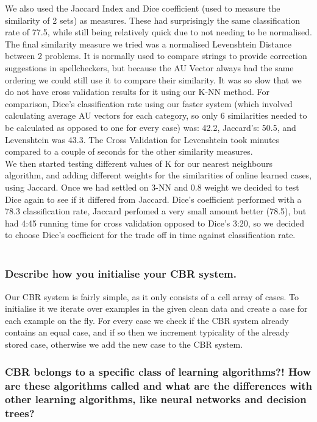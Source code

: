 \documentclass[12pt]{article}
\begin{document}
We also used the Jaccard Index and Dice coefficient (used to measure the similarity of 2 sets) as measures. These had surprisingly the same classification rate of 77.5, while still being relatively quick due to not needing to be normalised. \\

The final similarity measure we tried was a normalised Levenshtein Distance between 2 problems. It is normally used to compare strings to provide correction suggestions in spellcheckers, but because the AU Vector always had the same ordering we could still use it to compare their similarity. It was so slow that we do not have cross validation results for it using our K-NN method. For comparison, Dice's classification rate using our faster system (which involved calculating average AU vectors for each category, so only 6 similarities needed to be calculated as opposed to one for every case) was: 42.2, Jaccard's: 50.5, and Levenshtein was 43.3. The Cross Validation for Levenshtein took minutes compared to a couple of seconds for the other similarity measures.  \\

We then started testing different values of K for our nearest neighbours algorithm, and adding different weights for the similarities of online learned cases, using Jaccard. Once we had settled on 3-NN and 0.8 weight we decided to test Dice again to see if it differed from Jaccard. Dice's coefficient performed with a 78.3 classification rate, Jaccard perfomed a very small amount better (78.5), but had 4:45 running time for cross validation opposed to Dice's 3:20, so we decided to choose Dice's coefficient for the trade off in time against classification rate. \\ \\

\subsubsection*{Describe how you initialise your CBR system.}

Our CBR system is fairly simple, as it only consists of a cell array of cases. To initialise it we iterate over examples in the given clean data and create a case for each example on the fly. For every case we check if the CBR system already contains an equal case, and if so then we increment typicality of the already stored case, otherwise we add the new case to the CBR system.

\subsubsection*{CBR belongs to a specific class of learning algorithms?! How are these algorithms called and what are the differences with other learning algorithms, like neural networks and decision trees?}
\end{document}
